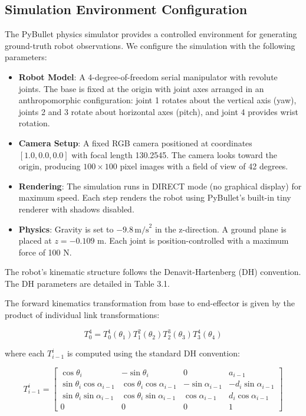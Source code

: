 \documentclass[12pt,a4paper,oneside]{report}
\begin{document}
\subsection{Simulation Environment Configuration}

The PyBullet physics simulator provides a controlled environment for generating ground-truth robot observations. We configure the simulation with the following parameters:

\begin{itemize}
    \item \textbf{Robot Model}: A 4-degree-of-freedom serial manipulator with revolute joints. The base is fixed at the origin with joint axes arranged in an anthropomorphic configuration: joint 1 rotates about the vertical axis (yaw), joints 2 and 3 rotate about horizontal axes (pitch), and joint 4 provides wrist rotation.
    \item \textbf{Camera Setup}: A fixed RGB camera positioned at coordinates $[1.0, 0.0, 0.0]$ with focal length 130.2545. The camera looks toward the origin, producing $100 \times 100$ pixel images with a field of view of 42 degrees.
    \item \textbf{Rendering}: The simulation runs in DIRECT mode (no graphical display) for maximum speed. Each step renders the robot using PyBullet's built-in tiny renderer with shadows disabled.
    \item \textbf{Physics}: Gravity is set to $-9.8 \, \text{m/s}^2$ in the z-direction. A ground plane is placed at $z = -0.109$ m. Each joint is position-controlled with a maximum force of 100 N.
\end{itemize}

The robot's kinematic structure follows the Denavit-Hartenberg (DH) convention. The DH parameters are detailed in Table 3.1.

The forward kinematics transformation from base to end-effector is given by the product of individual link transformations:

\begin{equation}
T_{0}^{4} = T_{0}^{1}(\theta_1) T_{1}^{2}(\theta_2) T_{2}^{3}(\theta_3) T_{3}^{4}(\theta_4)
\end{equation}

where each $T_{i-1}^{i}$ is computed using the standard DH convention:

\begin{equation}
T_{i-1}^{i} = 
\begin{bmatrix}
\cos\theta_i & -\sin\theta_i & 0 & a_{i-1} \\
\sin\theta_i \cos\alpha_{i-1} & \cos\theta_i \cos\alpha_{i-1} & -\sin\alpha_{i-1} & -d_i \sin\alpha_{i-1} \\
\sin\theta_i \sin\alpha_{i-1} & \cos\theta_i \sin\alpha_{i-1} & \cos\alpha_{i-1} & d_i \cos\alpha_{i-1} \\
0 & 0 & 0 & 1
\end{bmatrix}
\end{equation}
\end{document}

